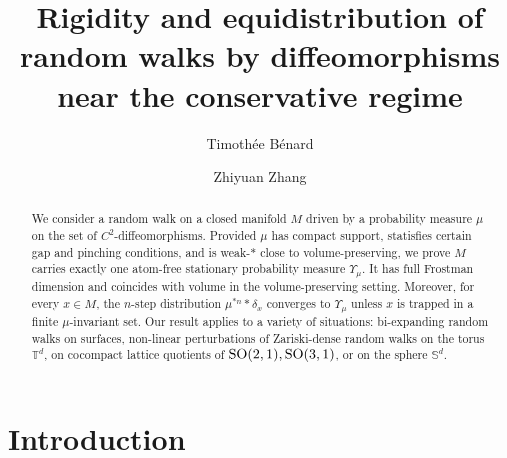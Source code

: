 \documentclass[11pt, leqno, fleqn]{amsart}
\def\SO{   {\rm SO}}
\newcommand{\T}{{\mathbb T}}
\theoremstyle{definition}
\theoremstyle{definition}
\def\S{ {\mathbb{S}} }
\begin{document}
			
			
			\title[Rigidity and equidistribution of random walks by diffeomorphisms]{Rigidity and equidistribution of random walks by diffeomorphisms near the conservative regime}
			
			 
 
			
			
				\author{Timoth\'ee B\'enard}				
			\address{Timoth\'ee B\'enard, 
				      Institut Galil\'ee
				     Universit\'e Paris 13, CNRS UMR 7539,
				  	99 avenue Jean-Baptiste Cl\'ement
					93430 - Villetaneuse
			}
			
			\author{Zhiyuan Zhang}
			
			\address{Zhiyuan Zhang,
				Department of Mathematics, 
				Imperial College London, 
				London SW7 2AZ, 
				United Kingdom
			}
			\maketitle
			  
			\begin{abstract}
			We consider a random walk on a closed manifold $M$ driven by a probability measure $\mu$ on the set of $C^2$-diffeomorphisms. Provided $\mu$ has compact support, statisfies certain gap and pinching conditions, and is weak-$*$ close to volume-preserving, we prove $M$ carries exactly one atom-free stationary probability measure $\Upsilon_{\mu}$. It has full Frostman dimension and coincides with volume in the volume-preserving setting. Moreover, for every $x\in M$, the $n$-step distribution $\mu^{*n}*\delta_{x}$ converges to  $\Upsilon_{\mu}$ unless $x$ is trapped in a finite $\mu$-invariant set. Our result applies to a variety of situations: bi-expanding random walks on surfaces, non-linear perturbations of Zariski-dense random walks on the torus $\T^d$,  on cocompact lattice quotients of $\SO(2,1), \SO(3,1)$, or on the sphere $\S^d$.
			
\end{abstract}

			
			 
			\tableofcontents
			
			\section{Introduction} \label{sec intro}
	
\end{document}
